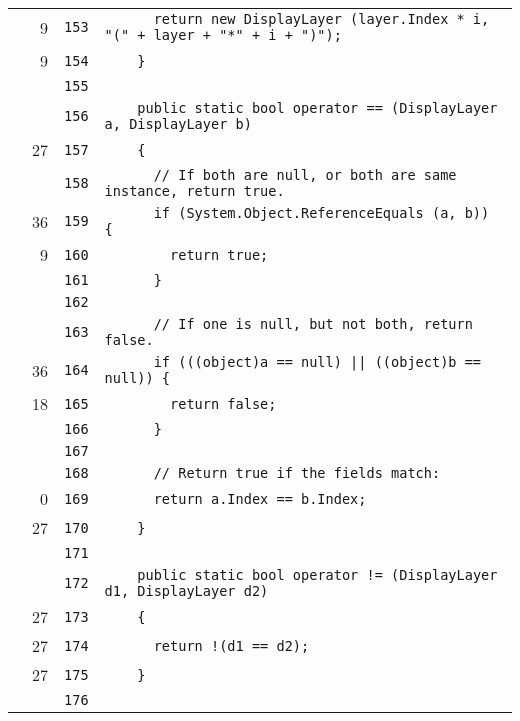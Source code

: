 \documentclass[a4paper,10pt]{article}
\begin{document}
\begin{longtable}[l]{lrrl}
\cellcolor{green} & 9 & \verb~153~ & \verb~      return new DisplayLayer (layer.Index * i, "(" + layer + "*" + i + ")");~\\
\cellcolor{green} & 9 & \verb~154~ & \verb~    }~\\
\cellcolor{gray} &  & \verb~155~ & \verb~~\\
\cellcolor{gray} &  & \verb~156~ & \verb~    public static bool operator == (DisplayLayer a, DisplayLayer b)~\\
\cellcolor{green} & 27 & \verb~157~ & \verb~    {~\\
\cellcolor{gray} &  & \verb~158~ & \verb~      // If both are null, or both are same instance, return true.~\\
\cellcolor{green} & 36 & \verb~159~ & \verb~      if (System.Object.ReferenceEquals (a, b)) {~\\
\cellcolor{green} & 9 & \verb~160~ & \verb~        return true;~\\
\cellcolor{gray} &  & \verb~161~ & \verb~      }~\\
\cellcolor{gray} &  & \verb~162~ & \verb~~\\
\cellcolor{gray} &  & \verb~163~ & \verb~      // If one is null, but not both, return false.~\\
\cellcolor{green} & 36 & \verb~164~ & \verb~      if (((object)a == null) || ((object)b == null)) {~\\
\cellcolor{green} & 18 & \verb~165~ & \verb~        return false;~\\
\cellcolor{gray} &  & \verb~166~ & \verb~      }~\\
\cellcolor{gray} &  & \verb~167~ & \verb~~\\
\cellcolor{gray} &  & \verb~168~ & \verb~      // Return true if the fields match:~\\
\cellcolor{red} & 0 & \verb~169~ & \verb~      return a.Index == b.Index;~\\
\cellcolor{green} & 27 & \verb~170~ & \verb~    }~\\
\cellcolor{gray} &  & \verb~171~ & \verb~~\\
\cellcolor{gray} &  & \verb~172~ & \verb~    public static bool operator != (DisplayLayer d1, DisplayLayer d2)~\\
\cellcolor{green} & 27 & \verb~173~ & \verb~    {~\\
\cellcolor{green} & 27 & \verb~174~ & \verb~      return !(d1 == d2);~\\
\cellcolor{green} & 27 & \verb~175~ & \verb~    }~\\
\cellcolor{gray} &  & \verb~176~ & \verb~~\\

\end{longtable}
\end{document}
